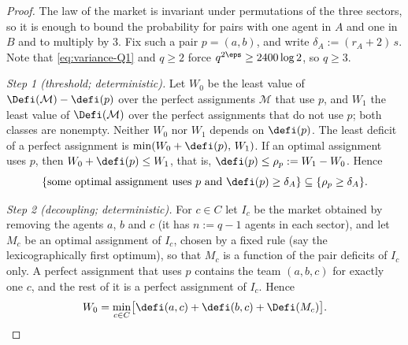 \begin{proof}
The law of the market is invariant under permutations of the three sectors, so it is
enough to bound the probability for pairs with one agent in $A$ and one in $B$ and to
multiply by $3$. Fix such a pair $p=(a,b)$, and write $\delta_A:=(r_A+2)\,s$. Note that
\eqref{eq:variance-Q1} and $q\ge2$ force $q^{2\eps}\ge2400\log2$, so $q\ge3$.

\emph{Step 1 (threshold; deterministic).} Let $W_0$ be the least value of
$\Defi(\mathcal M)-\defi(p)$ over the perfect assignments $\mathcal M$ that use $p$, and
$W_1$ the least value of $\Defi(\mathcal M)$ over the perfect assignments that do not use
$p$; both classes are nonempty. Neither $W_0$ nor $W_1$ depends on $\defi(p)$. The least
deficit of a perfect assignment is $\min(W_0+\defi(p),\,W_1)$. If an optimal assignment
uses $p$, then $W_0+\defi(p)\le W_1$, that is, $\defi(p)\le\rho_p:=W_1-W_0$. Hence
\begin{equation}\label{eq:variance-A1}
\{\text{some optimal assignment uses $p$ and }\defi(p)\ge\delta_A\}
\subseteq\{\rho_p\ge\delta_A\}.
\end{equation}

\emph{Step 2 (decoupling; deterministic).} For $c\in C$ let $I_c$ be the market obtained
by removing the agents $a$, $b$ and $c$ (it has $n:=q-1$ agents in each sector), and let
$M_c$ be an optimal assignment of $I_c$, chosen by a fixed rule (say the
lexicographically first optimum), so that $M_c$ is a function of the pair deficits of
$I_c$ only. A perfect assignment that uses $p$ contains the team $(a,b,c)$ for exactly one
$c$, and the rest of it is a perfect assignment of $I_c$. Hence
\begin{equation}\label{eq:variance-A2}
W_0=\min_{c\in C}\bigl[\defi(a,c)+\defi(b,c)+\Defi(M_c)\bigr].
\end{equation}


\end{proof}
